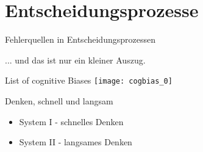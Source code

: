 \section{Entscheidungsprozesse}

\begin{frame}[c]{Fehlerquellen in Entscheidungsprozessen}
    \centering
    \only<1>{\texttt{[image: DecisionMakingProcedure]}}
\end{frame}


\begin{frame}[standout]
    ... und das ist nur ein kleiner Auszug.
\end{frame}

\begin{frame}[c]{List of cognitive Biases}
    \centering
    \texttt{[image: cogbias\_0]}
\end{frame}


\begin{frame}[c]{Denken, schnell und langsam}
    \Large
    \pause
    \begin{itemize}
    \item System I - schnelles Denken
    \newline
    \pause
    \item System II - langsames Denken
    \end{itemize}
\end{frame}

